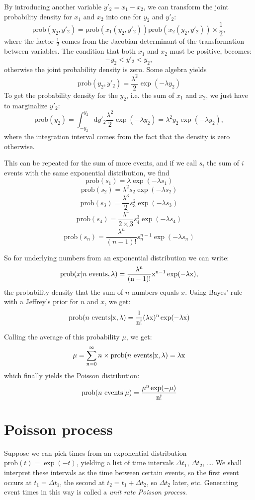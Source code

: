 \documentclass[a4paper,11pt]{article}
\newcommand{\ud}{\mathrm{d}}
\newcommand{\mcm}{\mathrm{,}}
\newcommand{\prob}{\mathrm{prob}}
\begin{document}
		By introducing another variable $y'_2 = x_1 - x_2$, we can transform the joint probability density 
		for $x_1$ and $x_2$ into one for $y_2$ and $y'_2$:
		\[ \prob(y_2,y'_2) = \prob\left(x_1(y_2,y'_2)\right)\prob\left(x_2(y_2,y'_2)\right)\times\frac{1}{2}\mcm \]
		where the factor $\frac{1}{2}$ comes from the Jacobian determinant of the transformation between variables.
		The condition that both $x_1$ and $x_2$ must be positive, becomes:
		\[ -y_2 < y'_2 < y_2 \mcm \]
		otherwise the joint probability density is zero. Some algebra yields
		\[ \prob(y_2,y'_2) = \frac{\lambda^2}{2}\exp(-\lambda y_2) \]
		To get the probability density for the $y_2$, i.e. the sum of $x_1$ and $x_2$, we just have to marginalize
		$y'_2$:
		\[ \prob(y_2) = \int_{-y_2}^{y_2} \ud y'_2 \frac{\lambda^2}{2}\exp(-\lambda y_2) = \lambda^2 y_2 \exp(-\lambda y_2) \mcm\]
		where the integration interval comes from the fact that the density is zero otherwise.

		This can be repeated for the sum of more events, and if we call $s_i$ the sum of $i$ events with
		the same exponential distribution, we find
		\[ \prob(s_1) = \lambda\exp(-\lambda s_1) \]
		\[ \prob(s_2) = \lambda^2 s_2 \exp(-\lambda s_2) \]
		\[ \prob(s_3) = \frac{\lambda^3}{2} s_3^2 \exp(-\lambda s_3) \]
		\[ \prob(s_4) = \frac{\lambda^4}{2\times 3} s_4^3 \exp(-\lambda s_4) \]
		\[ \cdots \]
		\[ \prob(s_n) = \frac{\lambda^n}{(n-1)!} s_n^{n-1} \exp(-\lambda s_n) \]

		So for underlying numbers from an exponential distribution we can write:
		\[ \prob(x| n \rm{\ events}, \lambda) = \frac{\lambda^n}{(n-1)!} x^{n-1} \exp(-\lambda x) \mcm \]
		the probability density that the sum of $n$ numbers equals $x$. Using Bayes' rule with a Jeffrey's
		prior for $n$ and $x$, we get:
		\[ \prob(n \rm{\ events} |x,\lambda) = \frac{1}{n!} (\lambda x)^n \exp(-\lambda x) \]

		Calling the average of this probability $\mu$, we get:
		\[ \mu = \sum_{n=0}^{\infty} n\times\prob(n \rm{\ events} | x,\lambda) = \lambda x \]
		which finally yields the Poisson distribution:
		\[ \prob(n \rm{\ events} | \mu) = \frac{\mu^n \exp(-\mu)}{n!} \]

	\section{Poisson process}

		Suppose we can pick times from an exponential distribution $\prob(t) = \exp(-t)$, yielding
		a list of time intervals $\Delta t_1$, $\Delta t_2$, \ldots. We shall interpret these intervals
		as the time between certain events, so the first event occurs at $t_1 = \Delta t_1$, the second
		at $t_2 = t_1 + \Delta t_2$, so $\Delta t_2$ later, etc. Generating event times in this way is
		called a {\em unit rate Poisson process}.
\end{document}
